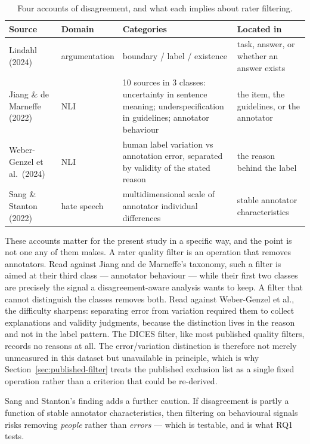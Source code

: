 \begin{table}[htbp]
\centering
\caption{Four accounts of disagreement, and what each implies about rater filtering.}
\label{tab:taxonomies}
\small
\begin{tabularx}{\textwidth}{p{2.5cm}p{2.2cm}Xp{2.6cm}}
\toprule
\textbf{Source} & \textbf{Domain} & \textbf{Categories} & \textbf{Located in} \\
\midrule
Lindahl (2024) & argumentation & boundary / label / existence & task, answer, or whether an
answer exists \\
Jiang \& de Marneffe (2022) & NLI & 10 sources in 3 classes: uncertainty in sentence meaning;
underspecification in guidelines; annotator behaviour & the item, the guidelines, or the
annotator \\
Weber-Genzel et al.\ (2024) & NLI & human label variation vs annotation error, separated by
validity of the stated reason & the reason behind the label \\
Sang \& Stanton (2022) & hate speech & multidimensional scale of annotator individual
differences & stable annotator characteristics \\
\bottomrule
\end{tabularx}
\end{table}

These accounts matter for the present study in a specific way, and the point is not one any of
them makes. A rater quality filter is an operation that removes annotators. Read against
Jiang and de Marneffe's taxonomy, such a filter is aimed at their third class --- annotator
behaviour --- while their first two classes are precisely the signal a disagreement-aware
analysis wants to keep. A filter that cannot distinguish the classes removes both. Read against
Weber-Genzel et al., the difficulty sharpens: separating error from variation required them to
collect explanations and validity judgments, because the distinction lives in the reason and not
in the label pattern. The DICES filter, like most published quality filters, records no reasons
at all. The error/variation distinction is therefore not merely unmeasured in this dataset but
unavailable in principle, which is why Section~\ref{sec:published-filter} treats the published
exclusion list as a single fixed operation rather than a criterion that could be re-derived.

Sang and Stanton's finding adds a further caution. If disagreement is partly a function of stable
annotator characteristics, then filtering on behavioural signals risks removing \emph{people}
rather than \emph{errors} --- which is testable, and is what RQ1 tests.

